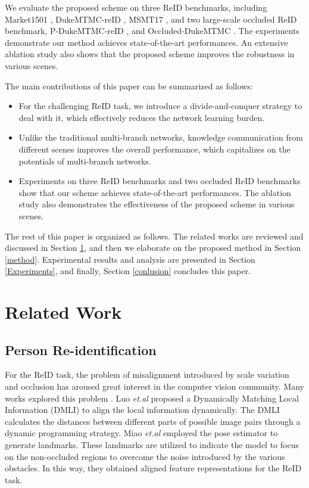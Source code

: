 \documentclass[a4paper]{cas-dc}
\begin{document}
We evaluate the proposed scheme on three ReID benchmarks, including Market1501 \cite{RN149}, DukeMTMC-reID \cite{RN170}, MSMT17 \cite{RN172}, and two large-scale occluded ReID benchmark, P-DukeMTMC-reID \cite{RN475}, and Occluded-DukeMTMC \cite{RN291}. The experiments demonstrate our method achieves state-of-the-art performances. An extensive ablation study also shows that the proposed scheme improves the robustness in various scenes. 

The main contributions of this paper can be summarized as follows:
\begin{itemize}
	\item For the challenging ReID task, we introduce a divide-and-conquer strategy to deal with it, which effectively reduces the network learning burden.
	\item Unlike the traditional multi-branch networks, knowledge communication from different scenes improves the overall performance, which capitalizes on the potentials of multi-branch networks. 
	\item Experiments on three ReID benchmarks and two occluded ReID benchmarks show that our scheme achieves state-of-the-art performances. The ablation study also demonstrates the effectiveness of the proposed scheme in various scenes.
\end{itemize}

The rest of this paper is organized as follows. The related works are reviewed and discussed in Section \ref{related work}, and then we elaborate on the proposed method in Section \ref{method}. Experimental results and analysis are presented in Section \ref{Experiments}, and finally, Section \ref{conlusion} concludes this paper.

\section{Related Work} \label{related work}

\subsection{Person Re-identification}
For the ReID task, the problem of misalignment introduced by scale variation and occlusion has aroused great interest in the computer vision community. Many works explored this problem \cite{RN456} \cite{RN350} \cite{RN178} \cite{RN263} \cite{RN477}. Luo \textit{et.al} \cite{RN263} proposed a Dynamically Matching Local Information (DMLI) to align the local information dynamically. The DMLI calculates the distances between different parts of possible image pairs through a dynamic programming strategy. Miao \textit{et.al} \cite{RN291} employed the pose estimator to generate landmarks. These landmarks are utilized to indicate the model to focus on the non-occluded regions to overcome the noise introduced by the various obstacles. In this way, they obtained aligned feature representations for the ReID task.
\end{document}
